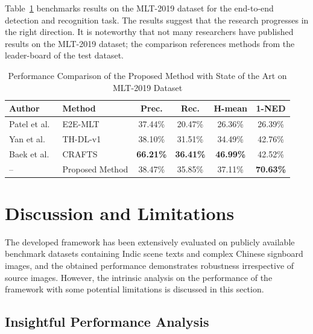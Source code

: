 \documentclass{ieeeaccess}
\begin{document}
{Table~\ref{tab:mlt_compare} benchmarks results on the MLT-2019 dataset for the
end-to-end detection and recognition task. The results suggest that the research
progresses in the right direction. It is noteworthy that not many researchers
have published results on the MLT-2019 dataset; the comparison references
methods from the leader-board of the test dataset.

\begin{table}[htbp]
\caption{Performance Comparison of the Proposed Method with State of the Art on MLT-2019 Dataset}
\label{tab:mlt_compare}
\renewcommand{\arraystretch}{1.1}
\begin{center}
\scriptsize
\begin{tabular}{|>{\raggedright\arraybackslash}p{1.1cm}|>{\raggedright\arraybackslash}p{1.4cm}|c|c|c|c|}
\hline
\textbf{Author} & \textbf{Method} & \textbf{Prec.} & \textbf{Rec.} & \textbf{H-mean} & \textbf{1-NED} \\
\hline
Patel et al.~\cite{b49} & E2E-MLT    & 37.44\% & 20.47\% & 26.36\% & 26.39\% \\
Yan et al.~\cite{b50}   & TH-DL-v1   & 38.10\% & 31.51\% & 34.49\% & 42.76\% \\
Baek et al.~\cite{b51}  & CRAFTS     & \textbf{66.21\%} & \textbf{36.41\%} & \textbf{46.99\%} & 42.52\% \\
\hline
-- & Proposed Method & 38.47\% & 35.85\% & 37.11\% & \textbf{70.63\%} \\
\hline
\end{tabular}
\end{center}
\end{table}

\section{Discussion and Limitations}
\label{sec:discussion}

The developed framework has been extensively evaluated on publicly
available benchmark datasets containing Indic scene texts and complex Chinese
signboard images, and the obtained performance demonstrates robustness
irrespective of source images. However, the intrinsic analysis on the
performance of the framework with some potential limitations is discussed in
this section.

\subsection{Insightful Performance Analysis}

}
\end{document}
